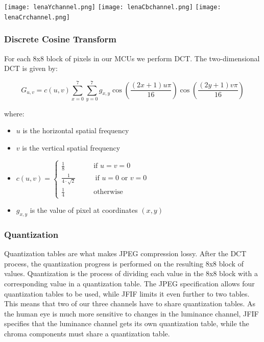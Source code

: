 \begin{infobox}
\begin{centering}
\texttt{[image: lenaYchannel.png]}
\texttt{[image: lenaCbchannel.png]}
\texttt{[image: lenaCrchannel.png]}
\label{fig:YCbCrChannels}
\end{centering}

\vspace{4mm}
\subsubsection{Discrete Cosine Transform}
\vspace{-2.5mm}

For each 8x8 block of pixels in our MCUs we perform DCT.
The two-dimensional DCT is given by:

$$ G_{u,v} = c(u,v)\sum_{x=0}^{7}\sum_{y=0}^{7}g_{x,y}\cos{\left(\frac{(2x+1)u\pi}{16}\right)}\cos{\left(\frac{(2y+1)v\pi}{16}\right)} $$

where:
\begin{itemize}
	\item $u$ is the horizontal spatial frequency 
	\item $v$ is the vertical spatial frequency 
	\item $c(u,v) = \begin{cases}\frac{1}{8} \quad \quad \quad \quad\text{if } u=v=0\\ 
	                             \frac{1}{4 \cdot \sqrt{2}} \,~\quad\quad \text{ if } u = 0 \text{ or } v = 0\\
	                             \frac{1}{4} \quad \quad \quad \quad\text{otherwise}
	                             \end{cases} $
    \item $g_{x,y}$ is the value of pixel at coordinates $(x,y)$ 
\end{itemize}

\vspace{4mm}
\subsubsection{Quantization}
\vspace{-2.5mm}
Quantization tables are what makes JPEG compression lossy. 
After the DCT process, the quantization progress is performed on the resulting 8x8 block of values.
Quantization is the process of dividing each value in the 8x8 block with a corresponding value in a quantization table. 
The JPEG specification allows four quantization tables to be used, while JFIF limits it even further to two tables. 
This means that two of our three channels have to share quantization tables. 
As the human eye is much more sensitive to changes in the luminance channel, JFIF specifies that the luminance channel gets its own quantization table, while the chroma components must share a quantization table.


\end{infobox}
